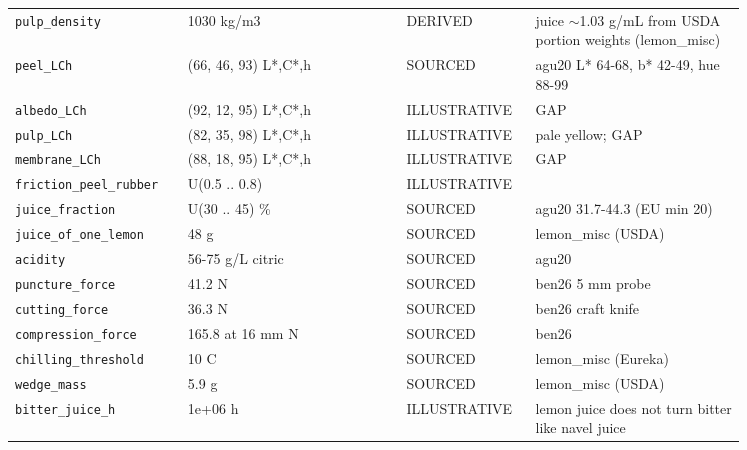 \documentclass[10.5pt,a4paper]{article}
\begin{document}
{\begin{longtable}{@{}p{0.2\linewidth}p{0.27\linewidth}p{0.12\linewidth}p{0.26\linewidth}@{}}
\texttt{pulp\_\allowbreak{}density} & 1030 kg/m3 & DERIVED & juice $\sim$1.03 g/mL from USDA portion weights (lemon\_misc) \\
\texttt{peel\_\allowbreak{}LCh} & (66, 46, 93) L*,C*,h & SOURCED & agu20 L* 64-68, b* 42-49, hue 88-99 \\
\texttt{albedo\_\allowbreak{}LCh} & (92, 12, 95) L*,C*,h & ILLUSTRATIVE & GAP \\
\texttt{pulp\_\allowbreak{}LCh} & (82, 35, 98) L*,C*,h & ILLUSTRATIVE & pale yellow; GAP \\
\texttt{membrane\_\allowbreak{}LCh} & (88, 18, 95) L*,C*,h & ILLUSTRATIVE & GAP \\
\texttt{friction\_\allowbreak{}peel\_\allowbreak{}rubber} & U(0.5 .. 0.8) & ILLUSTRATIVE &  \\
\texttt{juice\_\allowbreak{}fraction} & U(30 .. 45) \% & SOURCED & agu20 31.7-44.3 (EU min 20) \\
\texttt{juice\_\allowbreak{}of\_\allowbreak{}one\_\allowbreak{}lemon} & 48 g & SOURCED & lemon\_misc (USDA) \\
\texttt{acidity} & 56-75 g/L citric & SOURCED & agu20 \\
\texttt{puncture\_\allowbreak{}force} & 41.2 N & SOURCED & ben26 5 mm probe \\
\texttt{cutting\_\allowbreak{}force} & 36.3 N & SOURCED & ben26 craft knife \\
\texttt{compression\_\allowbreak{}force} & 165.8 at 16 mm N & SOURCED & ben26 \\
\texttt{chilling\_\allowbreak{}threshold} & 10 C & SOURCED & lemon\_misc (Eureka) \\
\texttt{wedge\_\allowbreak{}mass} & 5.9 g & SOURCED & lemon\_misc (USDA) \\
\texttt{bitter\_\allowbreak{}juice\_\allowbreak{}h} & 1e+06 h & ILLUSTRATIVE & lemon juice does not turn bitter like navel juice \\\bottomrule\end{longtable}}
\end{document}
